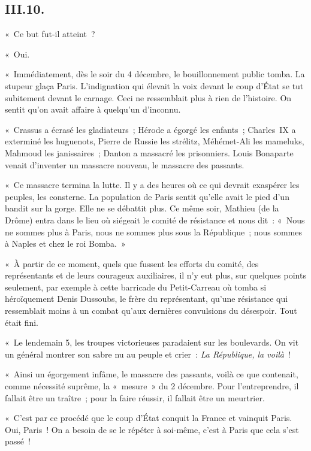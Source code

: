 \documentclass[french,twoside]{book} %
\begin{document}
\subsection[{III.10.}]{III.10.}
\noindent « Ce but fut-il atteint ?\par
« Oui.\par
« Immédiatement, dès le soir du 4 décembre, le bouillonnement public tomba. La stupeur glaça Paris. L’indignation qui élevait la voix devant le coup d’État se tut subitement devant le carnage. Ceci ne ressemblait plus à rien de l’histoire. On sentit qu’on avait affaire à quelqu’un d’inconnu.\par
« Crassus a écrasé les gladiateurs ; Hérode a égorgé les enfants ; Charles IX a exterminé les huguenots, Pierre de Russie les strélitz, Méhémet-Ali les mameluks, Mahmoud les janissaires ; Danton a massacré les prisonniers. Louis Bonaparte venait d’inventer un massacre nouveau, le massacre des passants.\par
« Ce massacre termina la lutte. Il y a des heures où ce qui devrait exaspérer les peuples, les consterne. La population de Paris sentit qu’elle avait le pied d’un bandit sur la gorge. Elle ne se débattit plus. Ce même soir, Mathieu (de la Drôme) entra dans le lieu où siégeait le comité de résistance et nous dit : « Nous ne sommes plus à Paris, nous ne sommes plus sous la République ; nous sommes à Naples et chez le roi Bomba. »\par
« À partir de ce moment, quels que fussent les efforts du comité, des représentants et de leurs courageux auxiliaires, il n’y eut plus, sur quelques points seulement, par exemple à cette barricade du Petit-Carreau où tomba si héroïquement Denis Dussoubs, le frère du représentant, qu’une résistance qui ressemblait moins à un combat qu’aux dernières convulsions du désespoir. Tout était fini.\par
« Le lendemain 5, les troupes victorieuses paradaient sur les boulevards. On vit un général montrer son sabre nu au peuple et crier : \emph{La République, la voilà} !\par
« Ainsi un égorgement infâme, le massacre des passants, voilà ce que contenait, comme nécessité suprême, la « mesure » du 2 décembre. Pour l’entreprendre, il fallait être un traître ; pour la faire réussir, il fallait être un meurtrier.\par
« C’est par ce procédé que le coup d’État conquit la France et vainquit Paris. Oui, Paris ! On a besoin de se le répéter à soi-même, c’est à Paris que cela s’est passé !\par
\end{document}
